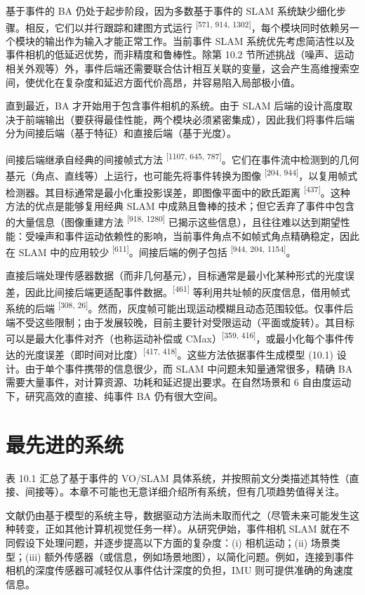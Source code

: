 基于事件的 BA 仍处于起步阶段，因为多数基于事件的 SLAM 系统缺少细化步骤。相反，它们以并行跟踪和建图方式运行 \textsuperscript{[571, 914, 1302]}，每个模块同时依赖另一个模块的输出作为输入才能正常工作。当前事件 SLAM 系统优先考虑简洁性以及事件相机的低延迟优势，而非精度和鲁棒性。除第 10.2 节所述挑战（噪声、运动相关外观等）外，事件后端还需要联合估计相互关联的变量，这会产生高维搜索空间，使优化在复杂度和延迟方面代价高昂，并容易陷入局部极小值。

直到最近，BA 才开始用于包含事件相机的系统。由于 SLAM 后端的设计高度取决于前端输出（要获得最佳性能，两个模块必须紧密集成），因此我们将事件后端分为间接后端（基于特征）和直接后端（基于光度）。

间接后端继承自经典的间接帧式方法 \textsuperscript{[1107, 645, 787]}。它们在事件流中检测到的几何基元（角点、直线等）上运行，也可能先将事件转换为图像 \textsuperscript{[204, 944]}，以复用帧式检测器。其目标通常是最小化重投影误差，即图像平面中的欧氏距离 \textsuperscript{[437]}。这种方法的优点是能够复用经典 SLAM 中成熟且鲁棒的技术；但它丢弃了事件中包含的大量信息（图像重建方法 \textsuperscript{[918, 1280]} 已揭示这些信息），且往往难以达到期望性能：受噪声和事件运动依赖性的影响，当前事件角点不如帧式角点精确稳定，因此在 SLAM 中的应用较少 \textsuperscript{[611]}。间接后端的例子包括 \textsuperscript{[944, 204, 1154]}。

直接后端处理传感器数据（而非几何基元），目标通常是最小化某种形式的光度误差，因此比间接后端更适配事件数据。\textsuperscript{[461]} 等利用共址帧的灰度信息，借用帧式系统的后端 \textsuperscript{[308, 26]}。然而，灰度帧可能出现运动模糊且动态范围较低。仅事件后端不受这些限制；由于发展较晚，目前主要针对受限运动（平面或旋转）。其目标可以是最大化事件对齐（也称运动补偿或 CMax）\textsuperscript{[359, 416]}，或最小化每个事件传达的光度误差（即时间对比度）\textsuperscript{[417, 418]}。这些方法依据事件生成模型 (10.1) 设计。由于单个事件携带的信息很少，而 SLAM 中问题未知量通常很多，精确 BA 需要大量事件，对计算资源、功耗和延迟提出要求。在自然场景和 6 自由度运动下，研究高效的直接、纯事件 BA 仍有很大空间。

\section{最先进的系统}

表 10.1 汇总了基于事件的 VO/SLAM 具体系统，并按照前文分类描述其特性（直接、间接等）。本章不可能也无意详细介绍所有系统，但有几项趋势值得关注。

文献仍由基于模型的系统主导，数据驱动方法尚未取而代之（尽管未来可能发生这种转变，正如其他计算机视觉任务一样）。从研究伊始，事件相机 SLAM 就在不同假设下处理问题，并逐步提高以下方面的复杂度：(i) 相机运动；(ii) 场景类型；(iii) 额外传感器（或信息，例如场景地图），以简化问题。例如，连接到事件相机的深度传感器可减轻仅从事件估计深度的负担，IMU 则可提供准确的角速度信息。

